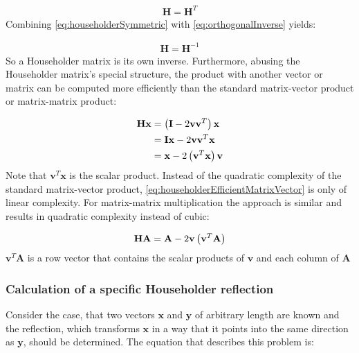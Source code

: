 \begin{align}
\label{eq:householderSymmetric}
\mathbf{H} = \mathbf{H}^T
\end{align}
%
Combining \cref{eq:householderSymmetric} with \cref{eq:orthogonalInverse} yields:

\begin{align}
\label{eq:householderInverse}
\mathbf{H} = \mathbf{H}^{-1}
\end{align}
%
So a Householder matrix is its own inverse.
Furthermore, abusing the Householder matrix's special structure, the product with another vector or matrix can be computed more efficiently than the standard matrix-vector product or matrix-matrix product:

\begin{align}
\nonumber
\mathbf{H} \mathbf{x}
&= 
\left(\mathbf{I} - 2\mathbf{v}\mathbf{v}^T\right)\mathbf{x}
\\&= 
\nonumber
\mathbf{I}\mathbf{x} - 2\mathbf{v}\mathbf{v}^T\mathbf{x}
\\&= 
\label{eq:householderEfficientMatrixVector}
\mathbf{x} - 2\left(\mathbf{v}^T\mathbf{x}\right)\mathbf{v}
\end{align}
%
Note that $\mathbf{v}^T\mathbf{x}$ is the scalar product.
Instead of the quadratic complexity of the standard matrix-vector product, \cref{eq:householderEfficientMatrixVector} is only of linear complexity.
For matrix-matrix multiplication the approach is similar and results in quadratic complexity instead of cubic:

\begin{align}
\label{eq:householderEfficientMatrixMatrix}
\mathbf{H} \mathbf{A}
=
\mathbf{A} - 2\mathbf{v}\left(\mathbf{v}^T\mathbf{A}\right)
\end{align}
%
$\mathbf{v}^T\mathbf{A}$ is a row vector that contains the scalar products of $\mathbf{v}$ and each column of $\mathbf{A}$


\subsubsection{Calculation of a specific Householder reflection}

Consider the case, that two vectors $\mathbf{x}$ and $\mathbf{y}$ of arbitrary length are known and the reflection, which transforms $\mathbf{x}$ in a way that it points into the same direction as $\mathbf{y}$, should be determined.
The equation that describes this problem is:

